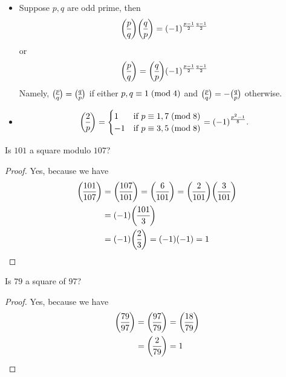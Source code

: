\begin{theorem}\mbox{}
	\begin{itemize}
		\item Suppose $p,q$ are odd prime, then $$\leg{p}{q}\leg{q}{p} = (-1)^{\frac{p-1}{2}\frac{q-1}{2}}$$or $$\leg{p}{q} =\leg{q}{p} (-1)^{\frac{p-1}{2}\frac{q-1}{2}}$$
		Namely, $\leg{p}{q} = \leg{q}{p}$ if either $p,q\equiv 1\;(\mbox{mod}{\;4})$ and $\leg{p}{q}=-\leg{q}{p}$ otherwise.
		\item 	\begin{equation*}
		\leg{2}{p}=\begin{cases}
		1 & \text{if $p\con{1,7}{8}$}\\
		-1 & \text{if $p\con{3,5}{8}$}
		\end{cases}=(-1)^{\frac{p^2-1}{8}}.
		\end{equation*}
	\end{itemize}
\end{theorem}
\begin{exercise}
	Is $101$ a square modulo $107$?
\end{exercise}
\begin{proof}
	Yes, because we have
	\begin{align*}
	\leg{101}{107}&=\leg{107}{101}=\leg{6}{101}=\leg{2}{101}\leg{3}{101}\\
	&=(-1)\leg{101}{3}\\
	&=(-1)\leg{2}{3} = (-1)(-1)=1
	\end{align*}
\end{proof}
\begin{exercise}
	Is $79$ a square of $97$?
\end{exercise}
\begin{proof}
	Yes, because we have
	\begin{align*}
	\leg{79}{97}&=\leg{97}{79}=\leg{18}{79}\\
	&=\leg{2}{79} = 1
	\end{align*}
\end{proof}

